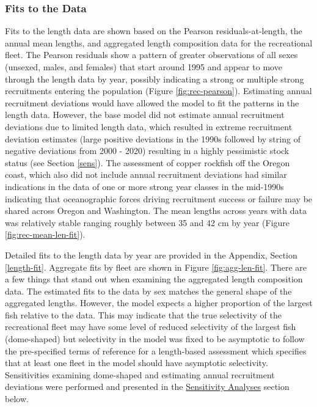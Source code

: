 \documentclass[11pt,
  english,
  a4paper,
]{article}
\begin{document}
\leavevmode\tagmcend\tagstructend\par


\hypertarget{fits-to-the-data}{%
\subsubsection{Fits to the Data}\label{fits-to-the-data}}

\leavevmode\tagmcend\tagstructend


Fits to the length data are shown based on the Pearson residuals-at-length, the annual mean lengths, and aggregated length composition data for the recreational fleet. The Pearson residuals show a pattern of greater observations of all sexes (unsexed, males, and females) that start around 1995 and appear to move through the length data by year, possibly indicating a strong or multiple strong recruitments entering the population (Figure \ref{fig:rec-pearson}). Estimating annual recruitment deviations would have allowed the model to fit the patterns in the length data. However, the base model did not estimate annual recruitment deviations due to limited length data, which resulted in extreme recruitment deviation estimates (large positive deviations in the 1990s followed by string of negative deviations from 2000 - 2020) resulting in a highly pessimistic stock status (see Section \ref{sens}). The assessment of copper rockfish off the Oregon coast, which also did not include annual recruitment deviations had similar indications in the data of one or more strong year classes in the mid-1990s indicating that oceanographic forces driving recruitment success or failure may be shared across Oregon and Washington. The mean lengths across years with data was relatively stable ranging roughly between 35 and 42 cm by year (Figure \ref{fig:rec-mean-len-fit}).

\leavevmode\tagmcend\tagstructend\par


Detailed fits to the length data by year are provided in the Appendix, Section \ref{length-fit}. Aggregate fits by fleet are shown in Figure \ref{fig:agg-len-fit}. There are a few things that stand out when examining the aggregated length composition data. The estimated fits to the data by sex matches the general shape of the aggregated lengths. However, the model expects a higher proportion of the largest fish relative to the data. This may indicate that the true selectivity of the recreational fleet may have some level of reduced selectivity of the largest fish (dome-shaped) but selectivity in the model was fixed to be asymptotic to follow the pre-specified terms of reference for a length-based assessment which specifies that at least one fleet in the model should have asymptotic selectivity. Sensitivities examining dome-shaped and estimating annual recruitment deviations were performed and presented in the {\protect\hyperlink{sensitivity-analyses}{Sensitivity Analyses}\leavevmode\tagmcend\tagstructend} section below.
\end{document}
